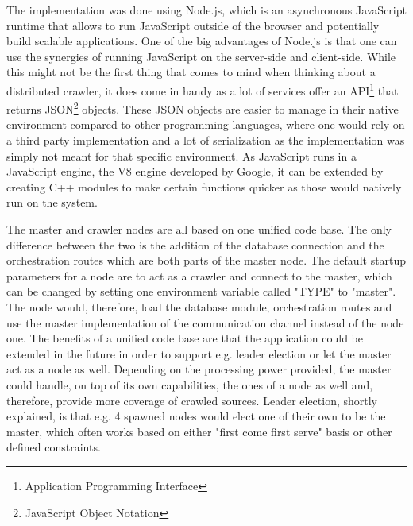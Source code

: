 The implementation was done using Node.js, which is an asynchronous JavaScript runtime that allows to run JavaScript outside of the browser and potentially build scalable applications. One of the big advantages of Node.js is that one can use the synergies of running JavaScript on the server-side and client-side. While this might not be the first thing that comes to mind when thinking about a distributed crawler, it does come in handy as a lot of services offer an API\footnote{Application Programming Interface} that returns JSON\footnote{JavaScript Object Notation} objects. These JSON objects are easier to manage in their native environment compared to other programming languages, where one would rely on a third party implementation and a lot of serialization as the implementation was simply not meant for that specific environment.
As JavaScript runs in a JavaScript engine, the V8 engine developed by Google, it can be extended by creating C++ modules to make certain functions quicker as those would natively run on the system.

The master and crawler nodes are all based on one unified code base. The only difference between the two is the addition of the database connection and the orchestration routes which are both parts of the master node. The default startup parameters for a node are to act as a crawler and connect to the master, which can be changed by setting one environment variable called "TYPE" to "master". The node would, therefore, load the database module, orchestration routes and use the master implementation of the communication channel instead of the node one.
The benefits of a unified code base are that the application could be extended in the future in order to support e.g. leader election or let the master act as a node as well. Depending on the processing power provided, the master could handle, on top of its own capabilities, the ones of a node as well and, therefore, provide more coverage of crawled sources.
Leader election, shortly explained, is that e.g. 4 spawned nodes would elect one of their own to be the master, which often works based on either "first come first serve" basis or other defined constraints.

